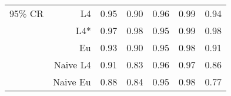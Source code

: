 \documentclass[a4paper,12pt,twoside]{book}
\begin{document}
\begin{table}[H]
\begin{tabular}{crrrrrr}
 {\color{blue} 95$\%$ CR }& L4  &0.95 & 0.90 & 0.96 & 0.99 & 0.94 \\ 

 
  &L4*  &   0.97 & 0.98 & 0.95 & 0.99 & 0.98 \\ 
  
&Eu &   0.93 & 0.90 & 0.95 & 0.98 & 0.91 \\ 
   
&Naive L4&   0.91 & 0.83 & 0.96 & 0.97 & 0.86 \\ 
 
&Naive Eu &   0.88 & 0.84 & 0.95 & 0.98 & 0.77 \\ 
  
\end{tabular}

\end{table}

\end{document}
